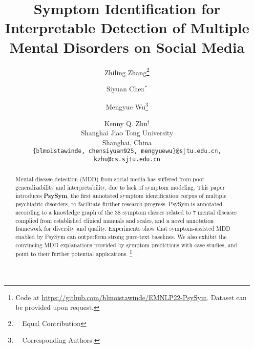 \documentclass[11pt]{article}
\title{Symptom Identification for Interpretable Detection of Multiple Mental Disorders on Social Media}
\author{Zhiling Zhang\thanks{~~Equal Contribution} \and Siyuan Chen$^*$ \and Mengyue Wu\thanks{~~Corresponding Authors. } \and Kenny Q. Zhu$^\dagger$\\
Shanghai Jiao Tong University \\
Shanghai, China\\
\texttt{\{blmoistawinde, chensiyuan925, mengyuewu\}@sjtu.edu.cn, kzhu@cs.sjtu.edu.cn} }
\begin{document}
\maketitle
\begin{abstract}
Mental disease detection (MDD) from social media has suffered from poor generalizability and 
interpretability, due to lack of symptom modeling.
This paper introduces \textbf{PsySym}, the first annotated symptom identification corpus 
of multiple psychiatric disorders, to facilitate further research progress. 
  PsySym is annotated according to a knowledge graph of the 38 symptom classes related to 7 mental diseases complied from established clinical manuals and scales, and a novel annotation framework for diversity and quality. 
  Experiments show that symptom-assisted MDD enabled by PsySym can outperform strong pure-text baselines. We also exhibit the convincing MDD explanations provided by symptom predictions with case studies, and point to their further potential applications. 
  \footnote{Code at \url{https://github.com/blmoistawinde/EMNLP22-PsySym}. Dataset can be provided upon request.}
\end{abstract}
















\appendix


\end{document}
